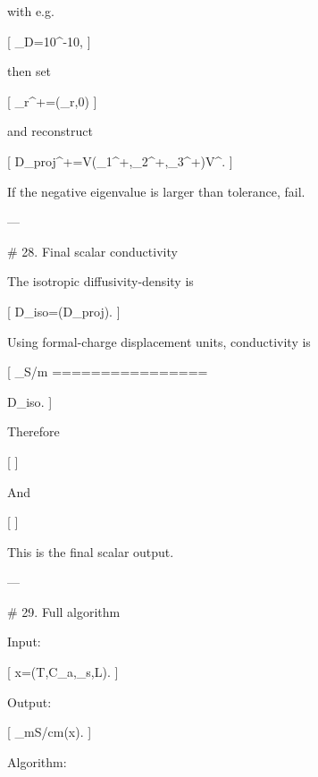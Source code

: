 with e.g.

[
\tau_D=10^{-10},
]

then set

[
\eta_r^+=\max(\eta_r,0)
]

and reconstruct

[
D_{\rm proj}^+=V(\eta_1^+,\eta_2^+,\eta_3^+)V^\top.
]

If the negative eigenvalue is larger than tolerance, fail.

---

# 28. Final scalar conductivity

The isotropic diffusivity-density is

[
D_{\rm iso}=(D_{\rm proj}).
]

Using formal-charge displacement units, conductivity is

[
\sigma_{\rm S/m}
================

D_{\rm iso}.
]

Therefore

[
]

And

[
]

This is the final scalar output.

---

# 29. Full algorithm

Input:

[
x=(T,{C_a},{\phi_s},\mathcal L).
]

Output:

[
\sigma_{\rm mS/cm}(x).
]

Algorithm:

